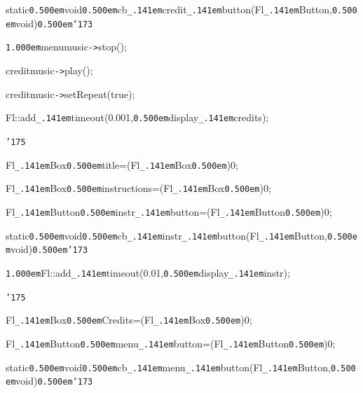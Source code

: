 \documentclass[12pt]{article}
\begin{document}
\noindent
{}static{\tt\mc \kern0.500em}void{\tt\mc \kern0.500em}cb{\tt\_\kern.141em}credit{\tt\_\kern.141em}button(Fl{\tt\_\kern.141em}Button{\tt *},{\tt\mc \kern0.500em}void{\tt *}){\tt\mc \kern0.500em}{\tt\char'173}

\noindent
{}{\tt\mc \kern1.000em}menumusic{\tt -}{\tt >}stop();

\noindent
{}creditmusic{\tt -}{\tt >}play();

\noindent
{}creditmusic{\tt -}{\tt >}setRepeat(true);

\noindent
{}Fl::add{\tt\_\kern.141em}timeout(0.001,{\tt\mc \kern0.500em}display{\tt\_\kern.141em}credits);

\noindent
{}{\tt\char'175}

\noindent
{}\hfill

\noindent
{}Fl{\tt\_\kern.141em}Box{\tt\mc \kern0.500em}{\tt *}title=(Fl{\tt\_\kern.141em}Box{\tt\mc \kern0.500em}{\tt *})0;

\noindent
{}\hfill

\noindent
{}Fl{\tt\_\kern.141em}Box{\tt\mc \kern0.500em}{\tt *}instructions=(Fl{\tt\_\kern.141em}Box{\tt\mc \kern0.500em}{\tt *})0;

\noindent
{}\hfill

\noindent
{}Fl{\tt\_\kern.141em}Button{\tt\mc \kern0.500em}{\tt *}instr{\tt\_\kern.141em}button=(Fl{\tt\_\kern.141em}Button{\tt\mc \kern0.500em}{\tt *})0;

\noindent
{}\hfill

\noindent
{}static{\tt\mc \kern0.500em}void{\tt\mc \kern0.500em}cb{\tt\_\kern.141em}instr{\tt\_\kern.141em}button(Fl{\tt\_\kern.141em}Button{\tt *},{\tt\mc \kern0.500em}void{\tt *}){\tt\mc \kern0.500em}{\tt\char'173}

\noindent
{}{\tt\mc \kern1.000em}Fl::add{\tt\_\kern.141em}timeout(0.01,{\tt\mc \kern0.500em}display{\tt\_\kern.141em}instr);

\noindent
{}{\tt\char'175}

\noindent
{}\hfill

\noindent
{}Fl{\tt\_\kern.141em}Box{\tt\mc \kern0.500em}{\tt *}Credits=(Fl{\tt\_\kern.141em}Box{\tt\mc \kern0.500em}{\tt *})0;

\noindent
{}\hfill

\noindent
{}Fl{\tt\_\kern.141em}Button{\tt\mc \kern0.500em}{\tt *}menu{\tt\_\kern.141em}button=(Fl{\tt\_\kern.141em}Button{\tt\mc \kern0.500em}{\tt *})0;

\noindent
{}\hfill

\noindent
{}static{\tt\mc \kern0.500em}void{\tt\mc \kern0.500em}cb{\tt\_\kern.141em}menu{\tt\_\kern.141em}button(Fl{\tt\_\kern.141em}Button{\tt *},{\tt\mc \kern0.500em}void{\tt *}){\tt\mc \kern0.500em}{\tt\char'173}
\end{document}

